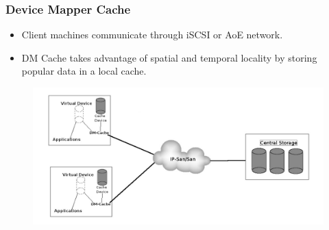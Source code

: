 \documentclass{beamer}
\begin{document}
    \begin{frame}
	\frametitle{Device Mapper Cache}
	\begin{itemize}
	    \item Client machines communicate through iSCSI or AoE network.
	    \item DM Cache takes advantage of spatial and temporal locality
		by storing popular data in a local cache.
	\end{itemize}
	\begin{figure}
	    \centering \includegraphics[scale=.31]{DMC.jpg}
	    \label{fig:dmc}
	\end{figure}
    \end{frame}
%
\end{document}
